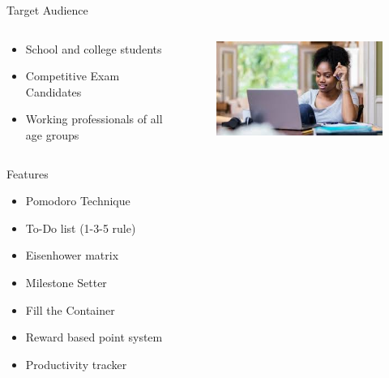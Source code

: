 \documentclass{beamer}
\begin{document}
	\begin{frame}{Target Audience}
	\begin{columns}
        \begin{column}{0.7\textwidth} %
			\begin{itemize}
			\item School and college students
  \bigskip			\item Competitive Exam Candidates
	  \bigskip		\item Working professionals of all age groups
			\end{itemize}

    	\end{column}
        
    	\begin{column}{0.3\textwidth} %
            \begin{figure}
                \includegraphics[width=\textwidth]{student.jpeg}
            \end{figure}
    	\end{column}
    \end{columns}
	\end{frame}

	\begin{frame}{Features}
                \begin{itemize}
		        	\item Pomodoro Technique
                	\item To-Do list (1-3-5 rule)
                	\item Eisenhower matrix
                	\item Milestone Setter
                	\item Fill the Container
                	\item Reward based point system
                	\item Productivity tracker
                \end{itemize}
        \end{frame}
\end{document}
